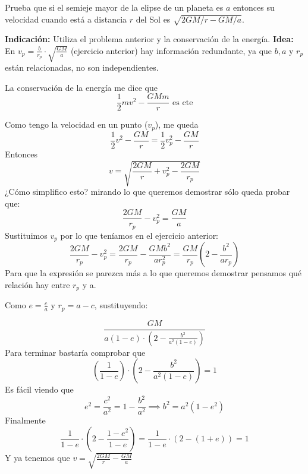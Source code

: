 \begin{problem}[6]
Prueba que si el semieje mayor de la elipse de un planeta es $a$ entonces su velocidad cuando está a distancia $r$ del Sol es $\sqrt{2GM/r-GM/a}$.

\textbf{Indicación:} Utiliza el problema anterior y la conservación de la energía.
\solution
\textbf{Idea:} En $v_p = \frac{b}{r_p}\cdot \sqrt{\frac{GM}{a}}$ (ejercicio anterior) hay información redundante, ya que $b,a\text{ y } r_p$ están relacionadas, no son independientes.

La conservación de la energía me dice que
$$\frac{1}{2}m v^2 - \frac{GMm}{r} \text{ es cte}$$

Como tengo la velocidad en un punto ($v_p$), me queda
$$\frac{1}{2} v^2 - \frac{GM}{r} = \frac{1}{2} v_p^2 - \frac{GM}{r}$$
Entonces
$$v = \sqrt{\frac{2GM}{r} + v_p^2 - \frac{2GM}{r_p}}$$
¿Cómo simplifico esto? mirando lo que queremos demostrar sólo queda probar que:
$$\frac{2GM}{r_p} - v_p^2 = \frac{GM}{a}$$
Sustituimos $v_p$ por lo que teníamos en el ejercicio anterior:
$$\frac{2GM}{r_p} - v_p^2 =\frac{2GM}{r_p} -\frac{GMb^2}{ar_p^2} = \frac{GM}{r_p}\left(2-\frac{b^2}{a r_p}\right) $$
Para que la expresión se parezca más a lo que queremos demostrar pensamos qué relación hay entre $r_p$ y a.


Como $e = \frac{c}{a}$ y $r_p = a-c$, sustituyendo:

$$\frac{GM}{a(1-e) \cdot (2-\frac{b^2}{a^2(1 - e)})}$$
Para terminar bastaría comprobar que
$$\left(\frac{1}{1-e} \right)\cdot \left(2- \frac{b^2}{a^2(1-e)}\right) = 1$$
Es fácil viendo que
$$e^2 = \frac{c^2}{a^2} = 1-\frac{b^2}{a^2} \implies b^2 = a^2(1-e^2)$$
Finalmente
$$\frac{1}{1-e} \cdot \left(2 - \frac{1 - e^2}{1 - e}\right) = \frac{1}{1-e} \cdot (2-(1 + e)) = 1$$
Y ya tenemos que $v=\sqrt{\frac{2GM}{r}- \frac{GM}{a}}$
\end{problem}

